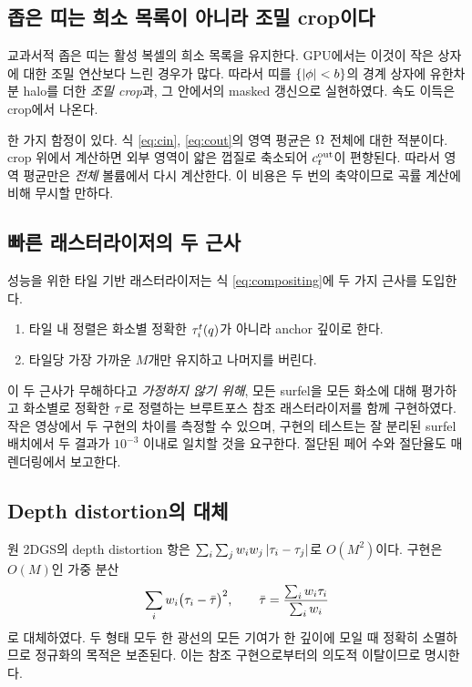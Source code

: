 \subsection{좁은 띠는 희소 목록이 아니라 조밀 crop이다}

교과서적 좁은 띠는 활성 복셀의 희소 목록을 유지한다. GPU에서는 이것이 작은 상자에
대한 조밀 연산보다 느린 경우가 많다. 따라서 띠를
$\{\left\lvert \phi \right\rvert<b\}$의 경계 상자에 유한차분 halo를 더한 \emph{조밀 crop}과, 그 안에서의
masked 갱신으로 실현하였다. 속도 이득은 crop에서 나온다.

한 가지 함정이 있다. 식 \eqref{eq:cin}, \eqref{eq:cout}의 영역 평균은 $\Omega$ 전체에
대한 적분이다. crop 위에서 계산하면 외부 영역이 얇은 껍질로 축소되어 $c^{\mathrm{out}}_t$이
편향된다. 따라서 영역 평균만은 \emph{전체} 볼륨에서 다시 계산한다. 이 비용은 두 번의
축약이므로 곡률 계산에 비해 무시할 만하다.

\subsection{빠른 래스터라이저의 두 근사}

성능을 위한 타일 기반 래스터라이저는 식 \eqref{eq:compositing}에 두 가지 근사를
도입한다.

\begin{enumerate}[leftmargin=2em]
  \item 타일 내 정렬은 화소별 정확한 $\tau^t_i(q)$가 아니라 anchor 깊이로 한다.
  \item 타일당 가장 가까운 $M$개만 유지하고 나머지를 버린다.
\end{enumerate}

이 두 근사가 무해하다고 \emph{가정하지 않기 위해}, 모든 surfel을 모든 화소에 대해
평가하고 화소별로 정확한 $\tau$로 정렬하는 브루트포스 참조 래스터라이저를 함께
구현하였다. 작은 영상에서 두 구현의 차이를 측정할 수 있으며, 구현의 테스트는 잘
분리된 surfel 배치에서 두 결과가 $10^{-3}$ 이내로 일치할 것을 요구한다. 절단된 페어
수와 절단율도 매 렌더링에서 보고한다.

\subsection{Depth distortion의 대체}

원 2DGS의 depth distortion 항은 $\sum_i\sum_j w_i w_j\left\lvert \tau_i-\tau_j \right\rvert$로
$O(M^2)$이다. 구현은 $O(M)$인 가중 분산
\begin{equation}
  \sum_i w_i\bigl(\tau_i - \bar{\tau}\bigr)^2,
  \qquad \bar{\tau} = \frac{\sum_i w_i \tau_i}{\sum_i w_i}
  \label{eq:distortion-surrogate}
\end{equation}
로 대체하였다. 두 형태 모두 한 광선의 모든 기여가 한 깊이에 모일 때 정확히 소멸하므로
정규화의 목적은 보존된다. 이는 참조 구현으로부터의 의도적 이탈이므로 명시한다.

